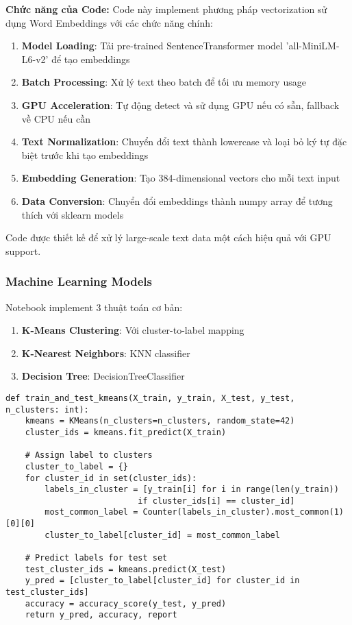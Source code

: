 \textbf{Chức năng của Code:}
Code này implement phương pháp vectorization sử dụng Word Embeddings với các chức năng chính:

\begin{enumerate}
    \item \textbf{Model Loading}: Tải pre-trained SentenceTransformer model 'all-MiniLM-L6-v2' để tạo embeddings
    
    \item \textbf{Batch Processing}: Xử lý text theo batch để tối ưu memory usage
    
    \item \textbf{GPU Acceleration}: Tự động detect và sử dụng GPU nếu có sẵn, fallback về CPU nếu cần
    
    \item \textbf{Text Normalization}: Chuyển đổi text thành lowercase và loại bỏ ký tự đặc biệt trước khi tạo embeddings
    
    \item \textbf{Embedding Generation}: Tạo 384-dimensional vectors cho mỗi text input
    
    \item \textbf{Data Conversion}: Chuyển đổi embeddings thành numpy array để tương thích với sklearn models
\end{enumerate}

Code được thiết kế để xử lý large-scale text data một cách hiệu quả với GPU support.

\subsubsection{Machine Learning Models}

Notebook implement 3 thuật toán cơ bản:

\begin{enumerate}
    \item \textbf{K-Means Clustering}: Với cluster-to-label mapping
    \item \textbf{K-Nearest Neighbors}: KNN classifier
    \item \textbf{Decision Tree}: DecisionTreeClassifier
\end{enumerate}

\begin{verbatim}
def train_and_test_kmeans(X_train, y_train, X_test, y_test, n_clusters: int):
    kmeans = KMeans(n_clusters=n_clusters, random_state=42)
    cluster_ids = kmeans.fit_predict(X_train)
    
    # Assign label to clusters
    cluster_to_label = {}
    for cluster_id in set(cluster_ids):
        labels_in_cluster = [y_train[i] for i in range(len(y_train)) 
                           if cluster_ids[i] == cluster_id]
        most_common_label = Counter(labels_in_cluster).most_common(1)[0][0]
        cluster_to_label[cluster_id] = most_common_label
    
    # Predict labels for test set
    test_cluster_ids = kmeans.predict(X_test)
    y_pred = [cluster_to_label[cluster_id] for cluster_id in test_cluster_ids]
    accuracy = accuracy_score(y_test, y_pred)
    return y_pred, accuracy, report
\end{verbatim}


